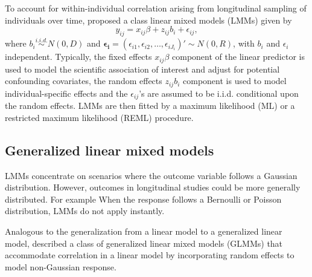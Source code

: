 To account for within-individual correlation arising from longitudinal sampling of individuals over time, \citet{laird1982random} proposed a class linear mixed models (LMMs) given by 
\begin{equation} \label{mod:lmm}
y_{ij}=x_{ij}\beta+z_{ij}b_i+\epsilon_{ij},
\end{equation}
where $b_i \stackrel{i.i.d.}{\sim} N(0,D)$ and $\mathbf{\epsilon_i}=(\epsilon_{i1},\epsilon_{i2},\dots,\epsilon_{iJ_i})' \sim N(0,R)$, with $b_i$ and $\epsilon_i$ independent. Typically, the fixed effects $x_{ij}\beta$ component of the linear predictor is used to model the scientific association of interest and adjust for potential confounding covariates, the random effects $z_{ij}b_i$ component is used to model individual-specific effects and the $\epsilon_{ij}$'s are assumed to be i.i.d. conditional upon the random effects. LMMs are then fitted by a maximum likelihood (ML) or a restricted maximum likelihood (REML) procedure. 

\subsection{Generalized linear mixed models}
LMMs concentrate on scenarios where the outcome variable follows a Gaussian distribution. However, outcomes in longitudinal studies could be more generally distributed. For example  When the response follows a Bernoulli or Poisson distribution, LMMs do not apply instantly. 

Analogous to the generalization from a linear model to a generalized linear model, \citet{breslow1993approximate} described a class of generalized linear mixed models (GLMMs) that accommodate correlation in a linear model by incorporating random effects to model non-Gaussian response. 

